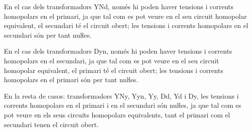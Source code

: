 En el cas dels transformadors YNd, només hi poden haver tensions i corrents homopolars en el primari, ja que tal com es pot veure en el seu circuit homopolar equivalent, el secundari té el circuit obert; les tensions i corrents homopolars en el secundari són per tant nuŀles.


En el cas dels transformadors Dyn, només hi poden haver tensions i corrents homopolars en el secundari, ja que tal com es pot veure en el seu circuit homopolar equivalent, el primari té el circuit obert; les tensions i corrents homopolars en el primari són per tant nuŀles.

En la resta de casos: transformadors YNy, Yyn, Yy, Dd, Yd i Dy, les tensions i corrents homopolars en el primari i en el secundari són  nuŀles, ja que tal com es pot veure en els seus circuits homopolars equivalents, tant el primari com el secundari tenen el circuit obert.

